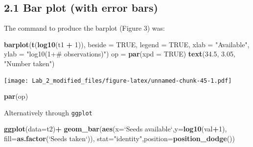 \documentclass[11pt,]{article}
\newenvironment{Shaded}{\begin{snugshade}}{\end{snugshade}}
\newcommand{\KeywordTok}[1]{\textcolor[rgb]{0.13,0.29,0.53}{\textbf{#1}}}
\newcommand{\DataTypeTok}[1]{\textcolor[rgb]{0.13,0.29,0.53}{#1}}
\newcommand{\DecValTok}[1]{\textcolor[rgb]{0.00,0.00,0.81}{#1}}
\newcommand{\FloatTok}[1]{\textcolor[rgb]{0.00,0.00,0.81}{#1}}
\newcommand{\StringTok}[1]{\textcolor[rgb]{0.31,0.60,0.02}{#1}}
\newcommand{\OtherTok}[1]{\textcolor[rgb]{0.56,0.35,0.01}{#1}}
\newcommand{\OperatorTok}[1]{\textcolor[rgb]{0.81,0.36,0.00}{\textbf{#1}}}
\newcommand{\NormalTok}[1]{#1}
\begin{document}
\subsection{2.1 Bar plot (with error
bars)}\label{bar-plot-with-error-bars}

The command to produce the barplot (Figure 3) was:

\begin{Shaded}
\begin{Highlighting}[]
\KeywordTok{barplot}\NormalTok{(}\KeywordTok{t}\NormalTok{(}\KeywordTok{log10}\NormalTok{(t1 }\OperatorTok{+}\StringTok{ }\DecValTok{1}\NormalTok{)), }\DataTypeTok{beside =} \OtherTok{TRUE}\NormalTok{, }\DataTypeTok{legend =} \OtherTok{TRUE}\NormalTok{, }\DataTypeTok{xlab =} \StringTok{"Available"}\NormalTok{,}
 \DataTypeTok{ylab =} \StringTok{"log10(1+# observations)"}\NormalTok{)}
\NormalTok{op =}\StringTok{ }\KeywordTok{par}\NormalTok{(}\DataTypeTok{xpd =} \OtherTok{TRUE}\NormalTok{)}
\KeywordTok{text}\NormalTok{(}\FloatTok{34.5}\NormalTok{, }\FloatTok{3.05}\NormalTok{, }\StringTok{"Number taken"}\NormalTok{)}
\end{Highlighting}
\end{Shaded}

\texttt{[image: Lab\_2\_modified\_files/figure-latex/unnamed-chunk-45-1.pdf]}

\begin{Shaded}
\begin{Highlighting}[]
\KeywordTok{par}\NormalTok{(op)}
\end{Highlighting}
\end{Shaded}

Alternatively through \texttt{ggplot}

\begin{Shaded}
\begin{Highlighting}[]
\KeywordTok{ggplot}\NormalTok{(}\DataTypeTok{data=}\NormalTok{t2)}\OperatorTok{+}
\StringTok{  }\KeywordTok{geom_bar}\NormalTok{(}\KeywordTok{aes}\NormalTok{(}\DataTypeTok{x=}\StringTok{`}\DataTypeTok{Seeds available}\StringTok{`}\NormalTok{,}\DataTypeTok{y=}\KeywordTok{log10}\NormalTok{(val}\OperatorTok{+}\DecValTok{1}\NormalTok{),}
               \DataTypeTok{fill=}\KeywordTok{as.factor}\NormalTok{(}\StringTok{`}\DataTypeTok{Seeds taken}\StringTok{`}\NormalTok{)),}
           \DataTypeTok{stat=}\StringTok{"identity"}\NormalTok{,}\DataTypeTok{position=}\KeywordTok{position_dodge}\NormalTok{())}
\end{Highlighting}
\end{Shaded}
\end{document}
